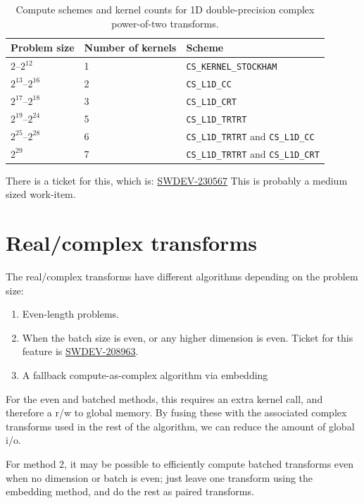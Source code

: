 \documentclass[12pt]{article}
\renewcommand{\(}{\left(}
\renewcommand{\)}{\right)}
\begin{document}
\begin{table}
  \begin{tabular}{lll}
    Problem size & Number of kernels & Scheme \\
    \hline
    $2$--$2^{12}$ & 1 &\texttt{CS_KERNEL_STOCKHAM} \\
    $2^{13}$--$2^{16}$ & 2 & \texttt{CS_L1D_CC} \\
    $2^{17}$--$2^{18}$ & 3 &\texttt{CS_L1D_CRT} \\
    $2^{19}$--$2^{24}$ & 5  &\texttt{CS_L1D_TRTRT} \\
    $2^{25}$--$2^{28}$ & 6 & \texttt{CS_L1D_TRTRT} and \texttt{CS_L1D_CC}  \\
    $2^{29}$ & 7 & \texttt{CS_L1D_TRTRT} and \texttt{CS_L1D_CRT}  \\
  \end{tabular}
  \caption{Compute schemes and kernel counts for 1D double-precision
    complex power-of-two transforms.}
  \label{1dkerneltable}
\end{table}  


There is a ticket for this, which is:
\href{http://ontrack-internal.amd.com/browse/SWDEV-230567}{SWDEV-230567}
This is probably a medium sized work-item.

\section{Real/complex transforms}

The real/complex transforms have different algorithms depending on the
problem size:
\begin{enumerate}
\item Even-length problems.
\item When the batch size is even, or any higher dimension is
  even. Ticket for this feature is
  \href{http://ontrack-internal.amd.com/browse/SWDEV-208963}{SWDEV-208963}.
\item A fallback compute-as-complex algorithm via embedding
\end{enumerate}
For the even and batched methods, this requires an extra kernel call,
and therefore a r/w to global memory.  By fusing these with the
associated complex transforms used in the rest of the algorithm, we can
reduce the amount of global i/o.

For method 2, it may be possible to efficiently compute batched
transforms even when no dimension or batch is even; just leave one
transform using the embedding method, and do the rest as paired
transforms.
\end{document}
